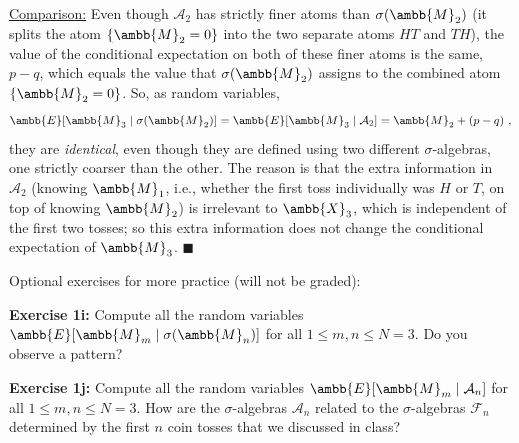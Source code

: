 \documentclass[12pt]{article} %
\newcommand{\mE}{\ambb{E}}
\newcommand{\mX}{\ambb{X}}
\newcommand{\mM}{\ambb{M}}
\newcommand{\cA}{\mathcal{A}}
\newcommand{\cF}{\mathcal{F}}
\begin{document}
\underline{Comparison:} Even though $\cA_2$ has strictly finer atoms
than $\sigma(\mM_2)$ (it splits the atom $\{\mM_2=0\}$ into the two
separate atoms $HT$ and $TH$), the value of the conditional
expectation on both of these finer atoms is the same, $p-q$, which
equals the value that $\sigma(\mM_2)$ assigns to the combined atom
$\{\mM_2=0\}$. So, as random variables,
\begin{equation}
  \mE[\mM_3\mid\sigma(\mM_2)] = \mE[\mM_3\mid \cA_2] = \mM_2 + (p-q)\ ,
\end{equation}
they are \emph{identical}, even though they are defined using two
different $\sigma$-algebras, one strictly coarser than the other. The
reason is that the extra information in $\cA_2$ (knowing $\mM_1$, i.e.,
whether the first toss individually was $H$ or $T$, on top of knowing
$\mM_2$) is irrelevant to $\mX_3$, which is independent of the first
two tosses; so this extra information does not change the conditional
expectation of $\mM_3$. \hfill$\blacksquare$

Optional exercises for more practice (will not be graded):

\textbf{Exercise 1i:} Compute all the random variables
$\mE[\mM_m\mid\sigma(\mM_n)]$ for all $1 \leq m,n \leq N=3$. Do you
observe a pattern?


\textbf{Exercise 1j:} Compute all the random variables
$\mE[\mM_m\mid \cA_n]$ for all $1\leq m,n\leq N=3$. How are the
$\sigma$-algebras $\cA_n$ related to the $\sigma$-algebras $\cF_n$
determined by the first $n$ coin tosses that we discussed in class?
\end{document}
